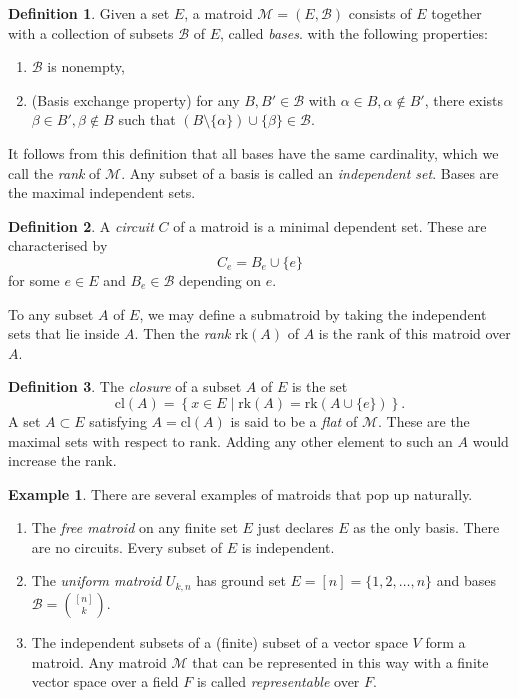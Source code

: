 \documentclass[12pt]{article}
\theoremstyle{definition}
\newtheorem{defn}{Definition}
\newtheorem{example}{Example}
\newcommand{\cl}{\text{cl}}
\newcommand{\M}{\mathcal{M}}
\newcommand{\B}{\mathcal{B}}
\begin{document}
\begin{defn}
Given a set $E$, a matroid $\M = (E, \B)$ consists of $E$ together with a collection of subsets $\B$ of $E$, called \textit{bases}. with the following properties:
\begin{enumerate}
	\item $\B$ is nonempty,
	\item (Basis exchange property) for any $B,B' \in \B$ with $\alpha \in B, \alpha \notin B'$, there exists $\beta \in B', \beta \notin B$ such that $(B \setminus \{\alpha\}) \cup \{ \beta \} \in \B$.
\end{enumerate}

\end{defn}
It follows from this definition that all bases have the same cardinality, which we call the \textit{rank} of $\M$. Any subset of a basis is called an \textit{independent set}. Bases are the maximal independent sets.
\begin{defn}
	A \textit{circuit} $C$ of a matroid is a minimal dependent set. These are characterised by \[ C_e = B_e \cup \{ e \} \]
	for some $e \in E$ and $B_e \in \B$ depending on $e$.
\end{defn}
To any subset $A$ of $E$, we may define a submatroid by taking the independent sets that lie inside $A$. Then the \textit{rank} $\text{rk}(A)$ of $A$ is the rank of this matroid over $A$.
\begin{defn}
	The \textit{closure} of a subset $A$ of $E$ is the set
	\[ \cl(A) = \left\{ x \in E \mid \text{rk}(A) = \text{rk}\left(A \cup \{e\}\right) \right\}. \]
	A set $A \subset E$ satisfying $A = \cl(A)$ is said to be a \textit{flat} of $\M$. These are the maximal sets with respect to rank. Adding any other element to such an $A$ would increase the rank.
\end{defn}
\begin{example}
There are several examples of matroids that pop up naturally.
\begin{enumerate}
	\item The \textit{free matroid} on any finite set $E$ just declares $E$ as the only basis. There are no circuits. Every subset of $E$ is independent.
	\item The \textit{uniform matroid} $U_{k,n}$ has ground set $E = [n] = \{1, 2, \dots, n\}$ and bases $\B = \binom{[n]}{k}$.
	\item The independent subsets of a (finite) subset of a vector space $V$ form a matroid. Any matroid $\M$ that can be represented in this way with a finite vector space over a field $F$ is called \textit{representable} over $F$.
\end{enumerate}
\end{example}
\end{document}
